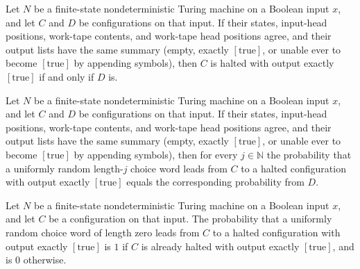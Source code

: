 \begin{theorem}
\label{Randomized.PolyAmp.accepting_congr}
\leanok
{}
Let $N$ be a finite-state nondeterministic Turing machine on a Boolean input $x$, and
let $C$ and $D$ be configurations on that input. If their states, input-head positions,
work-tape contents, and work-tape head positions agree, and their output lists have the
same summary (empty, exactly $[\mathrm{true}]$, or unable ever to become
$[\mathrm{true}]$ by appending symbols), then $C$ is halted with output exactly
$[\mathrm{true}]$ if and only if $D$ is.
\end{theorem}

\begin{theorem}
\label{Randomized.PolyAmp.accP_congr}
\leanok
{}
Let $N$ be a finite-state nondeterministic Turing machine on a Boolean input $x$, and
let $C$ and $D$ be configurations on that input. If their states, input-head positions,
work-tape contents, and work-tape head positions agree, and their output lists have the
same summary (empty, exactly $[\mathrm{true}]$, or unable ever to become
$[\mathrm{true}]$ by appending symbols), then for every $j\in\mathbb{N}$ the probability
that a uniformly random length-$j$ choice word leads from $C$ to a halted configuration
with output exactly $[\mathrm{true}]$ equals the corresponding probability from $D$.
\end{theorem}

\begin{theorem}
\label{Randomized.PolyAmp.accP_zero}
\leanok
{}
Let $N$ be a finite-state nondeterministic Turing machine on a Boolean input $x$, and
let $C$ be a configuration on that input. The probability that a uniformly random choice
word of length zero leads from $C$ to a halted configuration with output exactly
$[\mathrm{true}]$ is $1$ if $C$ is already halted with output exactly $[\mathrm{true}]$,
and is $0$ otherwise.
\end{theorem}

